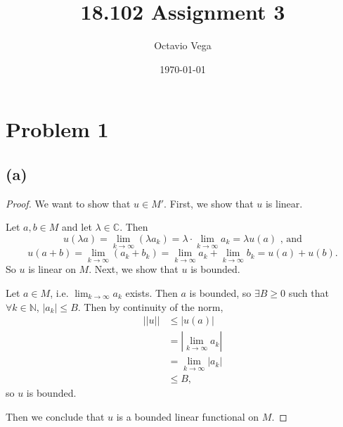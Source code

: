 \documentclass{article}
\title{18.102 Assignment 3}
\author{Octavio Vega}
\date\today
\begin{document}
\maketitle

\section*{Problem 1}
\subsection*{(a)}
\begin{proof}
	We want to show that $u \in M'$. First, we show that $u$ is linear.
	
	Let $a,b \in M$ and let $\lambda \in \mathbb{C}$. Then
	\begin{equation}
		u(\lambda a ) = \lim_{k\to\infty}(\lambda a_k) = \lambda \cdot \lim_{k \to \infty}a_k = \lambda u(a) \textrm{ , and}
	\end{equation} 
	\begin{equation}
		u(a+b) = \lim_{k\to\infty}(a_k + b_k) = \lim_{k \to \infty} a_k + \lim_{k \to \infty}b_k = u(a) + u(b).
	\end{equation}
	So $u$ is linear on $M$. Next, we show that $u$ is bounded.
	
	Let $a\in M$, i.e. $\lim_{k \to \infty} a_k$ exists. Then $a$ is bounded, so $\exists B \geq 0$ such that $\forall k\in\mathbb{N}$, $|a_k| \leq B$. Then by continuity of the norm,
	\begin{align}
		||u|| &\leq |u(a)|  \\
		&= \left|\lim_{k \to \infty}a_k\right| \\
		&= \lim_{k \to \infty} |a_k| \\
		&\leq B,
	\end{align} 
	so $u$ is bounded.
	
	Then we conclude that $u$ is a bounded linear functional on $M$. 
\end{proof}
\end{document}
